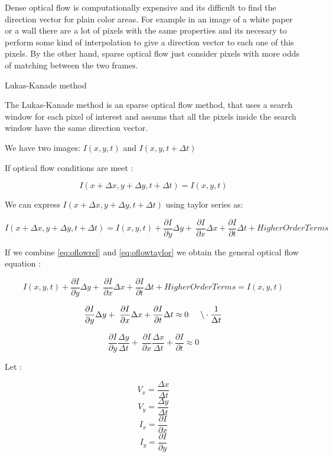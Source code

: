 Dense optical flow is computationally expensive and its difficult to find the direction vector 
for plain color areas. For example in an image of a white paper or a wall
there are a lot of pixels with the same properties and its necesary to perform some kind of interpolation to give a direction vector
 to each one of this pixels. 
By the other hand, sparse optical flow just consider pixels with more odds of matching between the two frames.

Lukas-Kanade method

The Lukas-Kanade method is an sparse optical flow method, that 
uses a search window for each pixel of interest and assums that all the pixels 
inside the search window have the same direction vector.


We have two images: $I(x,y,t)$ and $I(x,y,t+\Delta t)$ 

If optical flow conditions are meet :

\begin{equation}
\label{eq:oflowrel}
I(x + \Delta x,y + \Delta y, t + \Delta t) = I(x,y,t)
\end{equation}

We can express $I(x + \Delta x, y + \Delta y, t + \Delta t)$ using taylor series as:

\begin{equation}
\label{eq:oflowtaylor}
I(x + \Delta x, y + \Delta y, t + \Delta t) = I(x,y,t) + \frac{\partial I}{\partial y} \Delta y + \
 \frac{\partial I}{\partial x} \Delta x  + \frac{\partial I}{\partial t} \Delta t + Higher Order Terms 
\end{equation}

If we combine \ref{eq:oflowrel} and \ref{eq:oflowtaylor} we obtain the general optical flow equation :


$$ I(x,y,t) + \frac{\partial I}{\partial y} \Delta y + \
 \frac{\partial I}{\partial x} \Delta x  + \frac{\partial I}{\partial t} \Delta t + Higher Order Terms = I(x,y,t) $$


$$ \frac{\partial I}{\partial y} \Delta y + \
 \frac{\partial I}{\partial x} \Delta x  + \frac{\partial I}{\partial t} \Delta t \approx 0 \hspace{0.5cm} \backslash \cdot \frac{1}{\Delta t} $$


$$ \frac{\partial I}{\partial y} \frac{\Delta y}{\Delta t} + \
 \frac{\partial I}{\partial x} \frac{\Delta x}{\Delta t}  + \frac{\partial I}{\partial t}  \approx 0 $$


Let :

$$ V_x = \frac{\Delta x}{\Delta t} $$
$$ V_y = \frac{\Delta y}{\Delta t} $$
$$ I_x = \frac{\partial I}{\partial x}$$
$$ I_y = \frac{\partial I}{\partial y}$$

